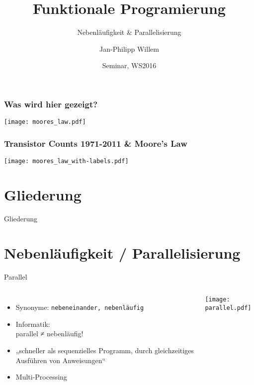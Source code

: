 \documentclass[compress]{beamer}
\title{Funktionale \break Programierung}
\subtitle{Nebenläufigkeit \& Parallelisierung}
\author{Jan-Philipp Willem}
\institute{
  Prof. Dr. Sandro Leuchter\\
  Fakultät für Informatik\\
  Hochschule Mannheim
}
\date{Seminar, WS2016}
\begin{document}
\begin{frame}
  \frametitle{Was wird hier gezeigt?}
  \texttt{[image: moores\_law.pdf]}
\end{frame}
 
\begin{frame}
  \frametitle{Transistor Counts 1971-2011 \& Moore's Law}
  \texttt{[image: moores\_law\_with-labels.pdf]}
\end{frame}

\maketitle

\section*{Gliederung}
\begin{frame}{Gliederung}
  \tableofcontents[hideallsubsections]
\end{frame}

\section{Nebenläufigkeit / Parallelisierung}
  \begin{frame}{Parallel}
  \setcounter{framenumber}{1}
    \begin{columns}[c]
      \begin{itemize}
        \item Synonyme: \texttt{nebeneinander, nebenläufig}
        \item Informatik:\\parallel ≠ nebenläufig!
        \item „schneller als sequenzielles Programm, durch \alert{gleichzeitiges} Ausführen von Anweisungen“
        \item Multi-Processing
      \end{itemize}
    \texttt{[image: parallel.pdf]}
    \end{columns}
  \end{frame}

\end{document}
